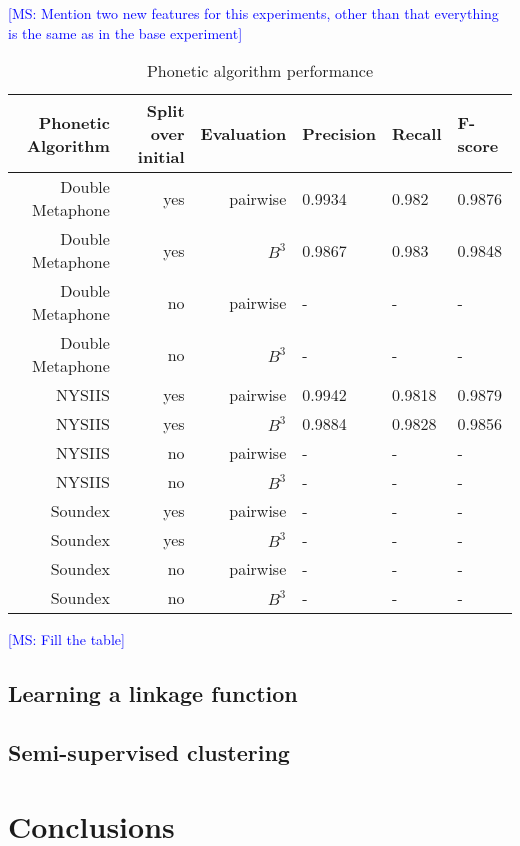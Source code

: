 \documentclass{article}
\newcommand{\msnote}[1]{\textcolor{blue}{[MS: #1]}}
\begin{document}
\msnote{Mention two new features for this experiments, other than that everything is the
same as in the base experiment}

\begin{table}[H]
\caption{Phonetic algorithm performance}
\centering
\begin{tabular}{|r|r|r|l|l|l|}
  \hline
  Phonetic Algorithm & Split over initial & Evaluation & Precision & Recall & F-score \\
  \hline
  Double Metaphone & yes & pairwise & 0.9934 & 0.982 & 0.9876 \\
  \hline
  Double Metaphone & yes & $B^3$ & 0.9867 & 0.983 & 0.9848 \\
  \hline
  Double Metaphone & no & pairwise & - & - & - \\
  \hline
  Double Metaphone & no & $B^3$ & - & - & - \\
  \hline
  NYSIIS & yes & pairwise & 0.9942 & 0.9818 & 0.9879 \\
  \hline
  NYSIIS & yes & $B^3$ & 0.9884 & 0.9828 & 0.9856 \\
  \hline
  NYSIIS & no & pairwise & - & - & - \\
  \hline
  NYSIIS & no & $B^3$ & - & - & - \\
  \hline
  Soundex & yes & pairwise & - & - & - \\
  \hline
  Soundex & yes & $B^3$ & - & - & - \\
  \hline
  Soundex & no & pairwise & - & - & - \\
  \hline
  Soundex & no & $B^3$ & - & - & - \\
  \hline
\end{tabular}
\end{table}

\msnote{Fill the table}


\subsection{Learning a linkage function}

\subsection{Semi-supervised clustering}



\section{Conclusions}
\label{conclusions}






\end{document}
